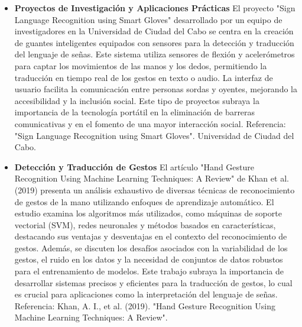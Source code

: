 \begin{itemize}
\item \textbf{Proyectos de Investigación y Aplicaciones Prácticas} \newline 
El proyecto "Sign Language Recognition using Smart Gloves" desarrollado por un equipo de investigadores en la Universidad de Ciudad del Cabo se centra en la creación de guantes inteligentes equipados con sensores para la detección y traducción del lenguaje de señas. Este sistema utiliza sensores de flexión y acelerómetros para captar los movimientos de las manos y los dedos, permitiendo la traducción en tiempo real de los gestos en texto o audio. La interfaz de usuario facilita la comunicación entre personas sordas y oyentes, mejorando la accesibilidad y la inclusión social. Este tipo de proyectos subraya la importancia de la tecnología portátil en la eliminación de barreras comunicativas y en el fomento de una mayor interacción social. \newline 
Referencia: "Sign Language Recognition using Smart Gloves". Universidad de Ciudad del Cabo. \cite{researchgate_sign_language}

\item \textbf{Detección y Traducción de Gestos} \newline 
El artículo "Hand Gesture Recognition Using Machine Learning Techniques: A Review" de Khan et al. (2019) presenta un análisis exhaustivo de diversas técnicas de reconocimiento de gestos de la mano utilizando enfoques de aprendizaje automático. El estudio examina los algoritmos más utilizados, como máquinas de soporte vectorial (SVM), redes neuronales y métodos basados en características, destacando sus ventajas y desventajas en el contexto del reconocimiento de gestos. Además, se discuten los desafíos asociados con la variabilidad de los gestos, el ruido en los datos y la necesidad de conjuntos de datos robustos para el entrenamiento de modelos. Este trabajo subraya la importancia de desarrollar sistemas precisos y eficientes para la traducción de gestos, lo cual es crucial para aplicaciones como la interpretación del lenguaje de señas. \newline 
Referencia: Khan, A. I., et al. (2019). "Hand Gesture Recognition Using Machine Learning Techniques: A Review". \cite{sciencedirect_s187705091931896x}


\end{itemize}
